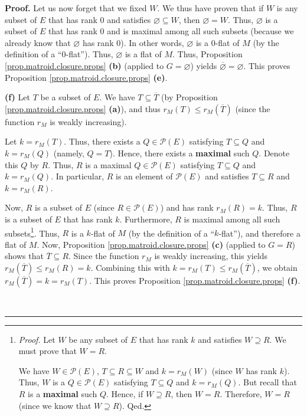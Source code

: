 \documentclass[numbers=enddot,12pt,final,onecolumn,notitlepage]{scrartcl}%
\theoremstyle{definition}
\newenvironment{proof}[1][Proof]{\noindent\textbf{#1.} }{\ \rule{0.5em}{0.5em}}
\begin{document}
\begin{proof}
Let us now forget that we fixed $W$. We thus have proven that if $W$ is any
subset of $E$ that has rank $0$ and satisfies $\varnothing\subseteq W$, then
$\varnothing=W$. Thus, $\varnothing$ is a subset of $E$ that has rank $0$ and
is maximal among all such subsets (because we already know that $\varnothing$
has rank $0$). In other words, $\varnothing$ is a $0$-flat of $M$ (by the
definition of a \textquotedblleft$0$-flat\textquotedblright). Thus,
$\varnothing$ is a flat of $M$. Thus, Proposition
\ref{prop.matroid.closure.props} \textbf{(b)} (applied to $G=\varnothing$)
yields $\overline{\varnothing}=\varnothing$. This proves Proposition
\ref{prop.matroid.closure.props} \textbf{(e)}.

\textbf{(f)} Let $T$ be a subset of $E$. We have $T\subseteq\overline{T}$ (by
Proposition \ref{prop.matroid.closure.props} \textbf{(a)}), and thus
$r_{M}\left(  T\right)  \leq r_{M}\left(  \overline{T}\right)  $ (since the
function $r_{M}$ is weakly increasing).

Let $k=r_{M}\left(  T\right)  $. Thus, there exists a $Q\in\mathcal{P}\left(
E\right)  $ satisfying $T\subseteq Q$ and $k=r_{M}\left(  Q\right)  $ (namely,
$Q=T$). Hence, there exists a \textbf{maximal} such $Q$. Denote this $Q$ by
$R$. Thus, $R$ is a maximal $Q\in\mathcal{P}\left(  E\right)  $ satisfying
$T\subseteq Q$ and $k=r_{M}\left(  Q\right)  $. In particular, $R$ is an
element of $\mathcal{P}\left(  E\right)  $ and satisfies $T\subseteq R$ and
$k=r_{M}\left(  R\right)  $.

Now, $R$ is a subset of $E$ (since $R\in\mathcal{P}\left(  E\right)  $) and
has rank $r_{M}\left(  R\right)  =k$. Thus, $R$ is a subset of $E$ that has
rank $k$. Furthermore, $R$ is maximal among all such
subsets\footnote{\textit{Proof.} Let $W$ be any subset of $E$ that has rank
$k$ and satisfies $W\supseteq R$. We must prove that $W=R$.
\par
We have $W\in\mathcal{P}\left(  E\right)  $, $T\subseteq R\subseteq W$ and
$k=r_{M}\left(  W\right)  $ (since $W$ has rank $k$). Thus, $W$ is a
$Q\in\mathcal{P}\left(  E\right)  $ satisfying $T\subseteq Q$ and
$k=r_{M}\left(  Q\right)  $. But recall that $R$ is a \textbf{maximal} such
$Q$. Hence, if $W\supseteq R$, then $W=R$. Therefore, $W=R$ (since we know
that $W\supseteq R$). Qed.}. Thus, $R$ is a $k$-flat of $M$ (by the definition
of a \textquotedblleft$k$-flat\textquotedblright), and therefore a flat of
$M$. Now, Proposition \ref{prop.matroid.closure.props} \textbf{(c)} (applied
to $G=R$) shows that $\overline{T}\subseteq R$. Since the function $r_{M}$ is
weakly increasing, this yields $r_{M}\left(  \overline{T}\right)  \leq
r_{M}\left(  R\right)  =k$. Combining this with $k=r_{M}\left(  T\right)  \leq
r_{M}\left(  \overline{T}\right)  $, we obtain $r_{M}\left(  \overline
{T}\right)  =k=r_{M}\left(  T\right)  $. This proves Proposition
\ref{prop.matroid.closure.props} \textbf{(f)}.


\end{proof}
\end{document}
